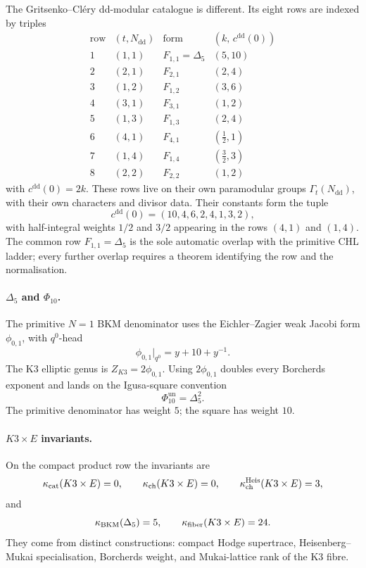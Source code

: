 The Gritsenko--Cl\'ery dd-modular catalogue is different.  Its eight rows
are indexed by triples
\[
\begin{array}{c|c|c|c}
\text{row} & (t,N_{\mathrm{dd}}) & \text{form} & (k,\,c^{\mathrm{dd}}(0))\\
\hline
1 & (1,1) & F_{1,1}=\Delta_5 & (5,10)\\
2 & (2,1) & F_{2,1} & (2,4)\\
3 & (1,2) & F_{1,2} & (3,6)\\
4 & (3,1) & F_{3,1} & (1,2)\\
5 & (1,3) & F_{1,3} & (2,4)\\
6 & (4,1) & F_{4,1} & (\tfrac12,1)\\
7 & (1,4) & F_{1,4} & (\tfrac32,3)\\
8 & (2,2) & F_{2,2} & (1,2)
\end{array}
\]
with \(c^{\mathrm{dd}}(0)=2k\).  These rows live on their own
paramodular groups \(\Gamma_t(N_{\mathrm{dd}})\), with their own
characters and divisor data.  Their constants form the tuple
\[
  c^{\mathrm{dd}}(0)=(10,4,6,2,4,1,3,2),
\]
with half-integral weights \(1/2\) and \(3/2\) appearing in the rows
\((4,1)\) and \((1,4)\).  The common row
\(F_{1,1}=\Delta_5\) is the sole automatic overlap with the primitive
CHL ladder; every further overlap requires a theorem identifying the
row and the normalisation.

\paragraph{\texorpdfstring{\(\Delta_5\)}{Delta5} and
\texorpdfstring{\(\Phi_{10}\)}{Phi10}.}
The primitive \(N=1\) BKM denominator uses the Eichler--Zagier weak
Jacobi form \(\phi_{0,1}\), with \(q^0\)-head
\[
  \phi_{0,1}|_{q^0}=y+10+y^{-1}.
\]
The K3 elliptic genus is \(Z_{K3}=2\phi_{0,1}\).  Using
\(2\phi_{0,1}\) doubles every Borcherds exponent and lands on the
Igusa-square convention
\[
  \Phi_{10}^{\mathrm{un}}=\Delta_5^2 .
\]
The primitive denominator has weight \(5\); the square has weight
\(10\).

\paragraph{\texorpdfstring{\(K3\times E\)}{K3xE} invariants.}
On the compact product row the invariants are
\[
  \kappa_{\mathrm{cat}}(K3\times E)=0,\qquad
  \kappa_{\mathrm{ch}}(K3\times E)=0,\qquad
  \kappa_{\mathrm{ch}}^{\mathrm{Heis}}(K3\times E)=3,
\]
and
\[
  \kappa_{\mathrm{BKM}}(\Delta_5)=5,\qquad
  \kappa_{\mathrm{fiber}}(K3\times E)=24.
\]
They come from distinct constructions: compact Hodge supertrace,
Heisenberg--Mukai specialisation, Borcherds weight, and Mukai-lattice
rank of the K3 fibre.

